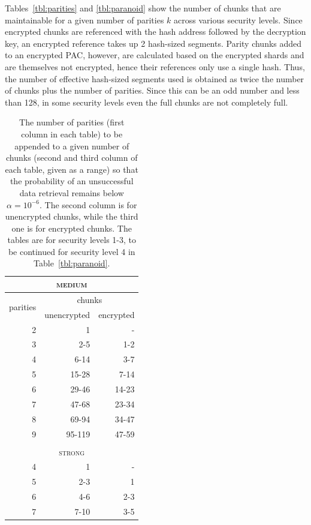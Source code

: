 \documentclass[manuscript,screen,review]{acmart}
\begin{document}
Tables~\ref{tbl:parities} and \ref{tbl:paranoid} show 
the number of chunks that are maintainable for a given number of parities $k$ across various security levels.
Since encrypted chunks are referenced with the hash address followed by the decryption key, an encrypted reference takes up 2 hash-sized segments. Parity chunks added to an encrypted PAC, however, are calculated based on the encrypted shards and are themselves not encrypted, hence their references only use a single hash. 
Thus, the number of effective hash-sized segments 
used is obtained as twice the number of chunks plus the number of parities. Since this can be an odd number and less than 128, in some security levels even the full chunks are not completely full.
%
\begin{table}[!ht]
\centering
\caption{The number of parities (first column in each table) to be appended to a given number of chunks (second and third column of each table, given as a range) so that the probability of an unsuccessful data retrieval remains below $\alpha = 10^{-6}$. The second column is for unencrypted  chunks, while the third one is for encrypted chunks. The tables are for security levels 1-3, to be continued for security level 4 in Table~\ref{tbl:paranoid}.}
\begin{minipage}{.49\linewidth}
\begin{tabular}{|r|r|r|}
\multicolumn{3}{c}{\textsc{medium}}\\\hline
\multirow{2}{1.5cm}{\centering 
 parities } 
&\multicolumn{2}{|c|}{ chunks }\\\cline{2-3}
&\multicolumn{1}{|c|}{unencrypted}
&\multicolumn{1}{|c|}{encrypted} \\\hline\hline
2 & 1 & - \\
3 & 2-5     & 1-2\\
4 & 6-14    & 3-7\\ 
5 & 15-28   & 7-14\\ 
6 & 29-46   & 14-23\\  
7 & 47-68   & 23-34\\  
8 & 69-94   & 34-47\\  
9 & 95-119  & 47-59\\   
\hline
%
\multicolumn{3}{c}{\textsc{}}\\
\multicolumn{3}{c}{\textsc{strong}}
\\\hline
4 & 1   &  -\\
5 & 2-3   & 1\\
6 & 4-6   & 2-3\\
7 & 7-10  & 3-5\\

\end{tabular}
\end{minipage}
\end{table}
\end{document}
